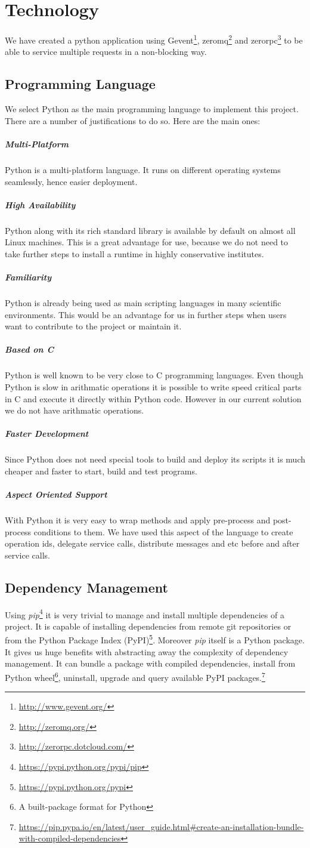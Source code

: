 \section{Technology}
We have created a python application using Gevent\footnote{\url{http://www.gevent.org/}},
zeromq\footnote{\url{http://zeromq.org/}} and zerorpc\footnote{\url{http://zerorpc.dotcloud.com/}} 
to be able to service multiple requests in a non-blocking way.

\subsection{Programming Language}
We select Python as the main programming language to implement this project. There are a number of 
justifications to do so. Here are the main ones:

\subparagraph{Multi-Platform} Python is a multi-platform language. It runs on different operating systems
seamlessly, hence easier deployment.
\subparagraph{High Availability} Python along with its rich standard library is available by default on almost all Linux machines. This
is a great advantage for use, because we do not need to take further steps to install a runtime in highly conservative institutes.
\subparagraph{Familiarity} Python is already being used as main scripting languages in many scientific environments. This would be an advantage
for us in further steps when users want to contribute to the project or maintain it.
\subparagraph{Based on C} Python is well known to be very close to C programming languages. Even though Python is slow in arithmatic operations
it is possible to write speed critical parts in C and execute it directly within Python code. However in our current solution we do not have
arithmatic operations.
\subparagraph{Faster Development} Since Python does not need special tools to build and deploy its scripts it is much cheaper and faster
to start, build and test programs.
\subparagraph{Aspect Oriented Support} With Python it is very easy to wrap methods and apply pre-process and post-process conditions to them. We have
used this aspect of the language to create operation ids, delegate service calls, distribute messages and etc before and after service calls.

\subsection{Dependency Management} Using \textit{pip}\footnote{\url{https://pypi.python.org/pypi/pip}}
it is very trivial to manage and install multiple
dependencies of a project. It is capable of installing dependencies from remote git repositories or from 
the Python Package Index (PyPI)\footnote{\url{https://pypi.python.org/pypi}}. Moreover \textit{pip} itself is
a Python package. It gives us huge benefits with abstracting away the complexity of dependency management. It can
bundle a package with compiled dependencies, install from Python wheel\footnote{A built-package format for Python}, uninstall,
upgrade and query available PyPI packages.\footnote{\url{https://pip.pypa.io/en/latest/user_guide.html\#create-an-installation-bundle-with-compiled-dependencies}}


